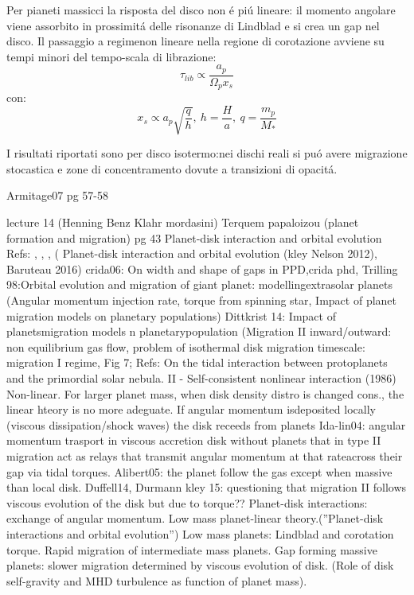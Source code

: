 Per pianeti massicci la risposta del disco non \'e pi\'u lineare: il momento angolare viene assorbito in prossimit\'a delle risonanze di Lindblad e si crea un gap nel disco. Il passaggio a regimenon lineare nella regione di corotazione avviene su tempi minori del tempo-scala di librazione:
\begin{equation}
\tau_{lib}\propto\frac{a_p}{\Omega_px_s}
\end{equation}
con:
\begin{equation}
x_s\propto a_p\sqrt{\frac{q}{h}}, \ h=\frac{H}{a},\ q=\frac{m_p}{M_*}
\end{equation}

I risultati riportati sono per disco isotermo:nei dischi reali si pu\'o avere migrazione stocastica e zone di concentramento dovute a transizioni di opacit\'a.

\cleardoublepage

\begin{workout}
Armitage07 pg 57-58
\end{workout}

\begin{workout}
lecture 14 (Henning Benz Klahr mordasini)
Terquem papaloizou (planet formation and migration) pg 43
Planet-disk interaction and orbital evolution
Refs: \cite{ward1997protoplanet}, \cite{terquem2000disks}, \cite{menou2004low}, (
Planet-disk interaction and orbital evolution (kley Nelson 2012), 
Baruteau 2016)
crida06: On width and shape of gaps in PPD,crida phd, 
Trilling 98:Orbital evolution and migration of giant planet: modellingextrasolar planets (Angular momentum injection rate, torque from spinning star, Impact of planet migration models on planetary populations)
Dittkrist 14: Impact of planetsmigration models n planetarypopulation (Migration II inward/outward: non equilibrium gas flow, problem of isothermal disk migration timescale: migration I regime, Fig 7;
Refs: On the tidal interaction between protoplanets and the primordial solar nebula. II - Self-consistent nonlinear interaction (1986)
Non-linear. For larger planet mass, when disk density distro is changed cons., the linear hteory is no more adeguate. If angular momentum isdeposited locally (viscous dissipation/shock waves)  the disk receeds from planets
Ida-lin04: angular momentum trasport in viscous accretion disk without planets that in type II migration act as relays that transmit angular momentum at that rateacross their gap via tidal torques.
Alibert05: the planet follow the gas except when massive than local disk.
Duffell14, Durmann kley 15: questioning that migration II follows viscous evolution of the disk but due to torque??
Planet-disk interactions: exchange of angular momentum. Low mass planet-linear theory.(''Planet-disk interactions and orbital evolution'')
Low mass planets: Lindblad and corotation torque. Rapid migration of intermediate mass planets. Gap forming massive planets: slower migration determined by viscous evolution of disk. (Role of disk self-gravity and MHD turbulence as function of planet mass).
\end{workout}


